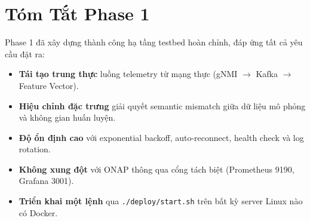 \documentclass[12pt,a4paper]{article}
\begin{document}
\section{Tóm Tắt Phase 1}

Phase 1 đã xây dựng thành công hạ tầng testbed hoàn chỉnh, đáp ứng tất cả yêu cầu đặt ra:

\begin{itemize}[leftmargin=2em]
\item \textbf{Tái tạo trung thực} luồng telemetry từ mạng thực (gNMI $\to$ Kafka $\to$ Feature Vector).
\item \textbf{Hiệu chỉnh đặc trưng} giải quyết semantic mismatch giữa dữ liệu mô phỏng và không gian huấn luyện.
\item \textbf{Độ ổn định cao} với exponential backoff, auto-reconnect, health check và log rotation.
\item \textbf{Không xung đột} với ONAP thông qua cổng tách biệt (Prometheus 9190, Grafana 3001).
\item \textbf{Triển khai một lệnh} qua \texttt{./deploy/start.sh} trên bất kỳ server Linux nào có Docker.
\end{itemize}
\end{document}

